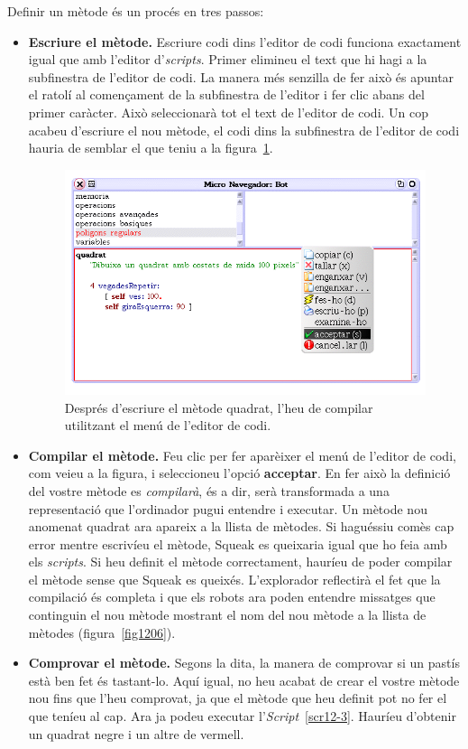 Definir un mètode és un procés en tres passos:
\begin{itemize}
\item[\textbf{1.}] \textbf{Escriure el mètode.} Escriure codi dins l'editor de codi funciona exactament igual que amb l'editor d'\emph{scripts}. Primer elimineu el text que hi hagi a la subfinestra de l'editor de codi. La manera més senzilla de fer això és apuntar el ratolí al començament de la subfinestra de l'editor i fer clic abans del primer caràcter. Això seleccionarà tot el text de l'editor de codi. Un cop acabeu d'escriure el nou mètode, el codi dins la subfinestra de l'editor de codi hauria de semblar el que teniu a la figura~\ref{fig1205}.
\begin{figure}[h!]
\begin{center}
\includegraphics[scale=1.5]{Imatges/figura12-5.png}
\end{center}
\caption{Després d'escriure el mètode \textsf{\upshape quadrat}, l'heu de compilar utilitzant el menú de l'editor de codi.}
\label{fig1205}
\end{figure}
\item[\textbf{2.}] \textbf{Compilar el mètode.}  Feu clic per fer aparèixer el menú de l'editor de codi, com veieu a la figura, i seleccioneu l'opció \textbf{acceptar}. En fer això la definició del vostre mètode es \emph{compilarà}, és a dir, serà transformada a una representació que l'ordinador pugui entendre i executar. Un mètode nou anomenat \textsf{quadrat} ara apareix a la llista de mètodes. Si haguéssiu comès cap error mentre escrivíeu el mètode, Squeak es queixaria igual que ho feia amb els \emph{scripts}.
Si heu definit el mètode correctament, hauríeu de poder compilar el mètode sense que Squeak es queixés. L'explorador reflectirà el fet que la compilació és completa i que els robots ara poden entendre missatges que continguin el nou mètode mostrant el nom del nou mètode a la llista de mètodes (figura~\ref{fig1206}).
\item[\textbf{3.}] \textbf{Comprovar el mètode.} Segons la dita, la manera de comprovar si un pastís està ben fet és tastant-lo. Aquí igual, no heu acabat de crear el vostre mètode nou fins que l'heu comprovat, ja que el mètode que heu definit pot no fer el que teníeu al cap. Ara ja podeu executar l'\emph{Script}~\ref{scr12-3}. Hauríeu d'obtenir un quadrat negre i un altre de vermell.
\end{itemize}

